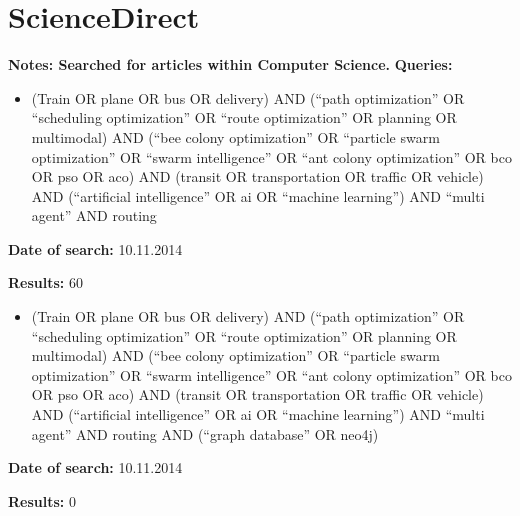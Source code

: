 \section{ScienceDirect}
\textbf{Notes: Searched for articles within Computer Science.  }
\newline
\newline
\textbf{Queries:}
\begin{itemize}
\item (Train OR plane OR bus OR delivery) AND (``path optimization'' OR ``scheduling optimization'' OR ``route optimization'' OR planning OR multimodal) AND (``bee colony optimization'' OR ``particle swarm optimization'' OR ``swarm intelligence'' OR ``ant colony optimization'' OR bco OR pso OR aco) AND (transit OR transportation OR traffic OR vehicle) AND (``artificial intelligence'' OR ai OR ``machine learning'') AND ``multi agent'' AND routing
\end{itemize}
\par \textbf{Date of search:} 10.11.2014
\par \textbf{Results:} 60
\begin{itemize}
\item (Train OR plane OR bus OR delivery) AND (``path optimization'' OR ``scheduling optimization'' OR ``route optimization'' OR planning OR multimodal) AND (``bee colony optimization'' OR ``particle swarm optimization'' OR ``swarm intelligence'' OR ``ant colony optimization'' OR bco OR pso OR aco) AND (transit OR transportation OR traffic OR vehicle) AND (``artificial intelligence'' OR ai OR ``machine learning'') AND ``multi agent'' AND routing AND (``graph database'' OR neo4j)
\end{itemize}
\par \textbf{Date of search:} 10.11.2014
\par \textbf{Results:} 0


